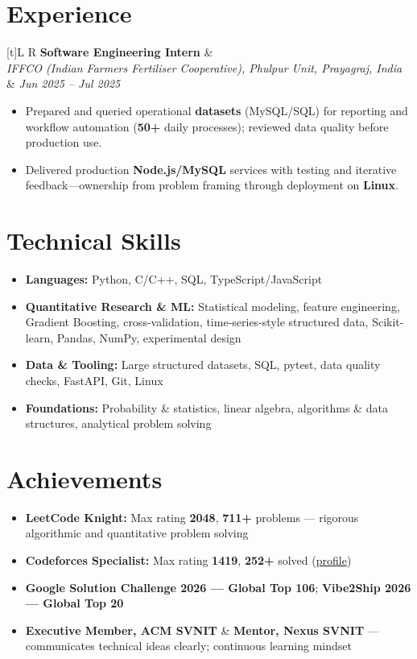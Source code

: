 \documentclass[a4paper,10pt]{article}
\newcommand{\resumeSubheading}[4]{%
  \vspace{0.5mm}
  \noindent
  \begin{tabularx}{\textwidth}[t]{L R}
    \textbf{#1} & #4 \\
    \textit{#3} & \textit{#2} \\
  \end{tabularx}
  \vspace{-0.5mm}%
}
\begin{document}
\section{Experience}
\small
\resumeSubheading
  {Software Engineering Intern}{Jun 2025 -- Jul 2025}
  {IFFCO (Indian Farmers Fertiliser Cooperative), Phulpur Unit, Prayagraj, India}{}
\begin{itemize}
  \item Prepared and queried operational \textbf{datasets} (MySQL/SQL) for reporting and workflow automation (\textbf{50+} daily processes); reviewed data quality before production use.
  \item Delivered production \textbf{Node.js/MySQL} services with testing and iterative feedback---ownership from problem framing through deployment on \textbf{Linux}.
\end{itemize}

\section{Technical Skills}
\small
\begin{itemize}[label={}]
  \item \textbf{Languages:} Python, C/C++, SQL, TypeScript/JavaScript
  \item \textbf{Quantitative Research \& ML:} Statistical modeling, feature engineering, Gradient Boosting, cross-validation, time-series-style structured data, Scikit-learn, Pandas, NumPy, experimental design
  \item \textbf{Data \& Tooling:} Large structured datasets, SQL, pytest, data quality checks, FastAPI, Git, Linux
  \item \textbf{Foundations:} Probability \& statistics, linear algebra, algorithms \& data structures, analytical problem solving
\end{itemize}

\section{Achievements}
\small
\begin{itemize}
  \item \textbf{LeetCode Knight:} Max rating \textbf{2048}, \textbf{711+} problems --- rigorous algorithmic and quantitative problem solving
  \item \textbf{Codeforces Specialist:} Max rating \textbf{1419}, \textbf{252+} solved (\href{https://codeforces.com/profile/Oju}{profile})
  \item \textbf{Google Solution Challenge 2026 --- Global Top 106}; \textbf{Vibe2Ship 2026 --- Global Top 20}
  \item \textbf{Executive Member, ACM SVNIT} \& \textbf{Mentor, Nexus SVNIT} --- communicates technical ideas clearly; continuous learning mindset
\end{itemize}
\end{document}

